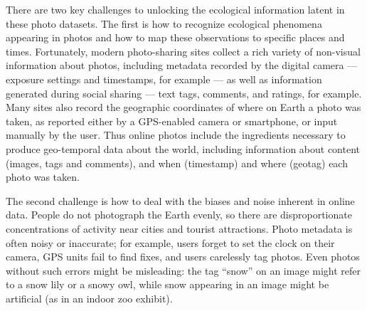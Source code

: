 There are two key challenges to unlocking the ecological
information latent in these photo datasets. The first is how to recognize 
ecological phenomena appearing in photos and how to map these observations to
specific places and times. Fortunately, modern photo-sharing sites
collect a rich variety of non-visual
information about photos, including metadata recorded by the digital
camera --- exposure settings and timestamps, for example --- as well as
information generated during social sharing  ---
text tags, comments, and ratings, for example. Many sites also
record the
 geographic coordinates of where on Earth a photo was taken, as reported either by a GPS-enabled camera or smartphone, or input manually by the user.
Thus online photos include the ingredients
necessary to produce geo-temporal data about the world,
including information about content (images, tags and comments), and
when (timestamp) and where (geotag) each photo was taken.

The second challenge is how to deal with the biases and noise inherent
in online data. People do not photograph the Earth evenly,
 so there are disproportionate concentrations of
activity near cities and tourist attractions. Photo metadata is often
noisy or inaccurate; for example, users forget to set the clock on
their camera, GPS units fail to find fixes, and users
carelessly tag photos.  Even photos without such errors might be
misleading: the tag ``snow'' on an image might refer to a snow lily or a
snowy owl, while snow appearing in an image might be artificial (as in an indoor zoo exhibit).

